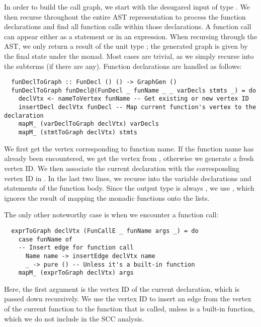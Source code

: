 In order to build the call graph, we start with the desugared input of type
. We then recurse throughout the entire AST
representation to process the function declarations and find all function calls
within those declarations. A function call can appear either as a statement or
in an expression.
When recursing through the AST, we only return a result of the unit type
\haskell{()}; the generated graph is given by the final state under the
 monad.
Most cases are trivial, as we simply recurse into the subterms (if there are
any). Function declarations are handled as follows:
\begin{verbatim}
  funDeclToGraph :: FunDecl () () -> GraphGen ()
  funDeclToGraph funDecl@(FunDecl _ funName _ _ varDecls stmts _) = do
    declVtx <- nameToVertex funName -- Get existing or new vertex ID
    insertDecl declVtx funDecl -- Map current function's vertex to the declaration
    mapM_ (varDeclToGraph declVtx) varDecls
    mapM_ (stmtToGraph declVtx) stmts
\end{verbatim}
%
We first get the vertex corresponding to function name. If the function name has
already been encountered, we get the vertex from , otherwise we
generate a fresh vertex ID.
We then associate the current declaration with the corresponding vertex ID in
. In the last two lines, we recurse into the variable declarations
and statements of the function body. Since the output type is always
, we use , which ignores the result of mapping
the monadic functions onto the lists.

The only other noteworthy case is when we encounter a function call:
\begin{verbatim}
  exprToGraph declVtx (FunCallE _ funName args _) = do
    case funName of
    -- Insert edge for function call
      Name name -> insertEdge declVtx name
      _ -> pure () -- Unless it's a built-in function
    mapM_ (exprToGraph declVtx) args
\end{verbatim}
%
Here, the first argument is the vertex ID of the current declaration, which is
passed down recursively. We use the vertex ID to insert an edge from the vertex
of the current function to the function that is called, unless  is
a built-in function, which we do not include in the SCC analysis.

